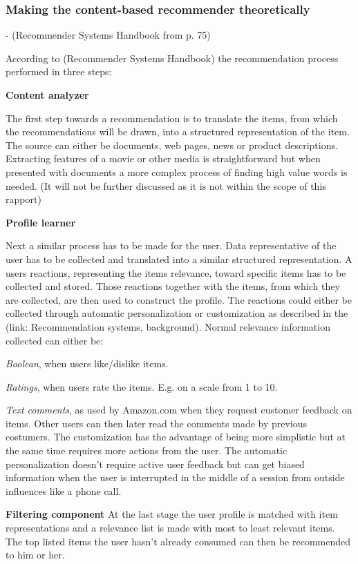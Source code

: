 \subsubsection{Making the content-based recommender theoretically}
- (Recommender Systems Handbook from p. 75)

According to (Recommender Systems Handbook) the recommendation process performed in three steps:

\textbf{Content analyzer}

The first step towards a recommendation is to translate the items, from which the recommendations will be drawn, into a structured representation of the item. The source can either be documents, web pages, news or product descriptions. Extracting features of a movie or other media is straightforward but when presented with documents a more complex process of finding high value words is needed. (It will not be further discussed as it is not within the scope of this rapport)    
 
\textbf{Profile learner}

Next a similar process has to be made for the user. Data representative of the user has to be collected and translated into a similar structured representation. A users reactions, representing the items relevance, toward specific items has to be collected and stored. Those reactions together with the items, from which they are collected, are then used to construct the profile. The reactions could either be collected through automatic personalization or customization as described in the (link: Recommendation systems, background). Normal relevance information collected can either be:

\emph{Boolean}, when users like/dislike items.

\emph{Ratings}, when users rate the items. E.g. on a scale from 1 to 10.

\emph{Text comments}, as used by Amazon.com when they request customer feedback on items. Other users can then later read the comments made by previous costumers. The customization has the advantage of being more simplistic but at the same time requires more actions from the user. The automatic personalization doesn't require active user feedback but can get biased information when the user is interrupted in the middle of a session from outside influences like a phone call.
 
\textbf{Filtering component}
At the last stage the user profile is matched with item representations and a relevance list is made with most to least relevant items. The top listed items the user hasn't already consumed can then be recommended to him or her.
 
